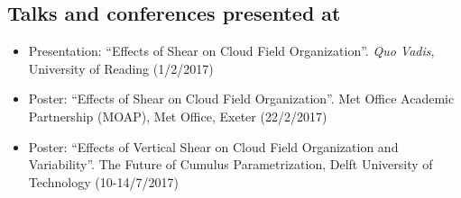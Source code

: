 \documentclass[11pt,a4paper]{article}
\begin{document}
\subsection*{Talks and conferences presented at}

\begin{itemize}
  \item Presentation: ``Effects of Shear on Cloud Field Organization''. \textit{Quo Vadis}, University of Reading (1/2/2017)
  \item Poster: ``Effects of Shear on Cloud Field Organization''. Met Office Academic Partnership (MOAP), Met Office, Exeter (22/2/2017)
  \item Poster: ``Effects of Vertical Shear on Cloud Field Organization and Variability''. The Future of Cumulus Parametrization, Delft University of Technology (10-14/7/2017)
\end{itemize}
\end{document}
